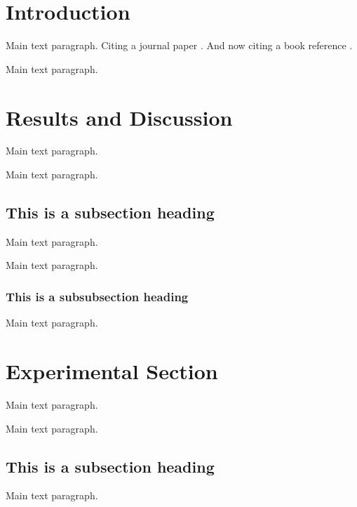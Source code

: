\documentclass[genes,article,submit,moreauthors,pdftex,12pt,a4paper]{mdpi} %
\begin{document}

\section{Introduction}

Main text paragraph. Citing a journal paper \cite{ref-journal}. And now citing a book reference \cite{ref-book}.

Main text paragraph.


\section{Results and Discussion}

Main text paragraph.


Main text paragraph.


\subsection{This is a subsection heading}

Main text paragraph.

Main text paragraph.


\subsubsection{This is a subsubsection heading}

Main text paragraph.


\section{Experimental Section}

Main text paragraph.


Main text paragraph.

\subsection{This is a subsection heading}

Main text paragraph.

\end{document}
